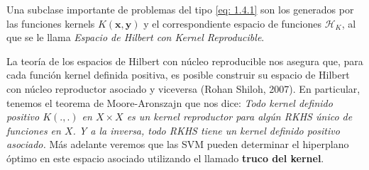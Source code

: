 \documentclass[letterpaper,12pt,oneside]{book}
\begin{document}
{{Una subclase importante de problemas del tipo \eqref{eq: 1.4.1} son los generados por las funciones kernels \(K(\mathbf{x},\mathbf{y})\) y el correspondiente espacio de funciones \(\mathcal{H}_K\), al que se le llama \textit{Espacio de Hilbert con Kernel Reproducible}.

La teoría de los espacios de Hilbert con núcleo reproducible nos asegura que, para cada función kernel definida positiva, es posible construir su espacio de Hilbert con núcleo reproductor asociado y viceversa (Rohan Shiloh, 2007). En particular, tenemos el teorema de Moore-Aronszajn que nos dice: \textit{Todo kernel definido positivo \(K (.,.)\) en \(X \times X\) es un kernel reproductor para algún RKHS único de funciones en \(X\). Y a la inversa, todo RKHS tiene un kernel definido positivo asociado.}
Más adelante veremos que las SVM pueden determinar el hiperplano óptimo en este espacio asociado utilizando el llamado \textbf{truco del kernel}.

}}
\end{document}
